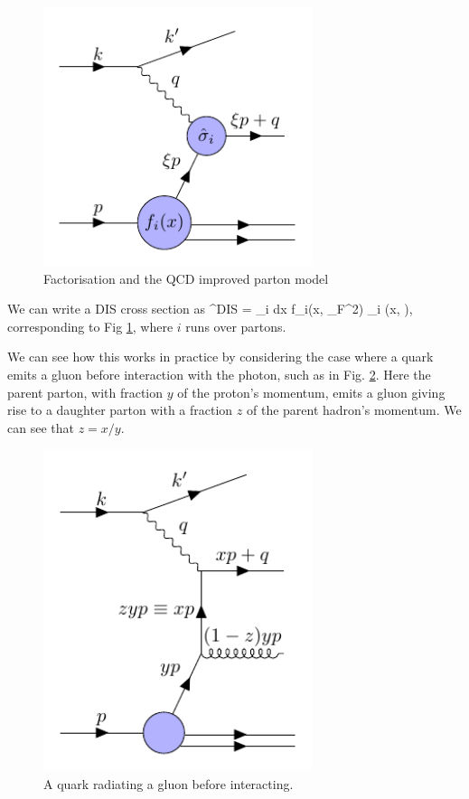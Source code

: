 \begin{figure}[H]
\centering
\includegraphics[width=0.7\textwidth]{../diagrams/improvedparton_dis.pdf}
\caption{\label{fig:improvedparton} Factorisation and the QCD improved parton model}
\end{figure}


We can write a DIS cross section as
\be
\label{eqn:disfact}
\sigma^{DIS} = \sum_i \int dx f_i(x, \mu_F^2) \hat{\sigma}_i \bigg(x,  \bigg),
\ee
corresponding to Fig \ref{fig:improvedparton}, where $i$ runs over partons.

We can see how this works in practice by considering the case where a quark emits a gluon before interaction with the photon, such as in Fig. \ref{fig:scalingviolation}. Here the parent parton, with fraction $y$ of the proton's momentum, emits a gluon giving rise to a daughter parton with a fraction $z$ of the parent hadron's momentum. We can see that $z = x/y$.

\begin{figure}[H]
\centering
\includegraphics[width=0.7\textwidth]{../diagrams/scalingviolation.pdf}
\caption{\label{fig:scalingviolation} A quark radiating a gluon before interacting.}
\end{figure}

